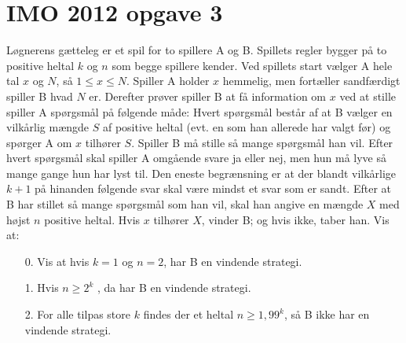 \documentclass[article,10pt,a4,oneside]{memoir}
\begin{document}
\begin{minipage}[b]{1.95\textwidth}
\begin{minipage}[t]{0.23\linewidth}
\section*{IMO 2012 opgave 3}
Løgnerens gætteleg er et spil for to spillere A og B. Spillets regler bygger på to positive
heltal $k$ og $n$ som begge spillere kender. Ved spillets start vælger A hele tal $x$ og $N$, så $1 \le x \le N$. Spiller A holder $x$ hemmelig, men fortæller sandfærdigt spiller B hvad $N$ er. Derefter prøver spiller B at få information om $x$ ved at stille spiller A spørgsmål på følgende måde: Hvert spørgsmål består af at B vælger en vilkårlig mængde $S$ af positive heltal (evt. en som han allerede har valgt før) og spørger A om $x$ tilhører $S$. Spiller B må stille så mange spørgsmål han vil. Efter hvert spørgsmål skal spiller A omgående svare ja eller nej, men hun må lyve så mange gange hun har lyst til. Den eneste begrænsning er at der blandt vilkårlige $k + 1$ på hinanden følgende svar skal være mindst et svar som er sandt. Efter at B har stillet så mange spørgsmål som han vil, skal han angive en mængde $X$ med højst $n$ positive heltal. Hvis $x$ tilhører $X$, vinder B; og hvis ikke, taber han. Vis at:
\begin{enumerate}
\item[0.] Vis at hvis $k=1$ og $n=2$, har B en vindende strategi.
\item[1.] Hvis $n \ge 2^k$ , da har B en vindende strategi.
\item[2.] For alle tilpas store $k$ findes der et heltal $n \ge 1,99^k$, så B ikke har en vindende strategi.
\end{enumerate}


\end{minipage}
\end{minipage}
\end{document}
